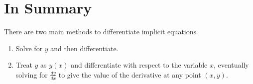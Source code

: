 \documentclass{ximera}
\begin{document}
\section{In Summary}
There are two main methods to differentiate implicit equations
\begin{enumerate}
\item{Solve for $y$ and then differentiate.}
\item{Treat $y$ as $y(x)$ and differentiate with respect to the variable $x$, eventually solving for $\frac{dy}{dx}$ to give the value of the derivative at any point $(x,y)$.}
\end{enumerate}
\pagebreak
\end{document}

